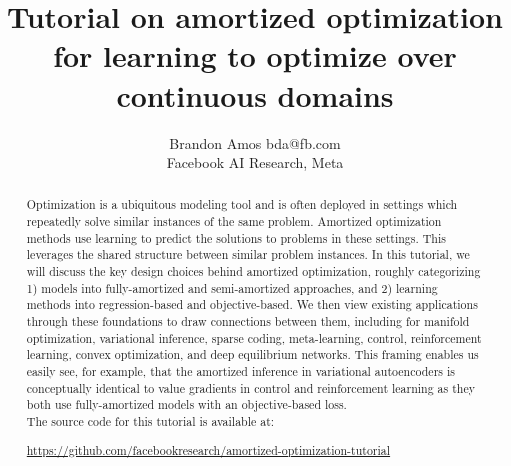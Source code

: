 \documentclass[twoside,11pt]{article}
\begin{document}
\title{Tutorial on amortized optimization for
learning to optimize over continuous domains}
\author{\name Brandon Amos \email bda@fb.com \\
  \addr Facebook AI Research, Meta}
\editor{}

\maketitle

\begin{abstract}
  Optimization is a ubiquitous modeling tool and is often
  deployed in settings which repeatedly solve similar
  instances of the same problem.
  Amortized optimization methods use learning to predict
  the solutions to problems in these settings.
  This leverages the shared structure between
  similar problem instances.
  In this tutorial, we will discuss the key design choices
  behind amortized optimization,
  roughly categorizing 1) models into fully-amortized
  and semi-amortized approaches, and 2) learning methods
  into regression-based and objective-based.
  We then view existing applications through these
  foundations to draw connections between them,
  including for manifold optimization, variational inference,
  sparse coding, meta-learning, control, reinforcement learning,
  convex optimization, and deep equilibrium networks.
  This framing enables us easily see, for example, that the
  amortized inference in variational autoencoders is conceptually
  identical to value gradients in control and reinforcement
  learning as they both use fully-amortized models with
  an objective-based loss. \\

  \noindent The source code for this tutorial is available at:
  \begin{center}
  \url{https://github.com/facebookresearch/amortized-optimization-tutorial}
  \end{center}
\end{abstract}

\newpage
\setcounter{tocdepth}{2}
\tableofcontents

\newpage
\end{document}
